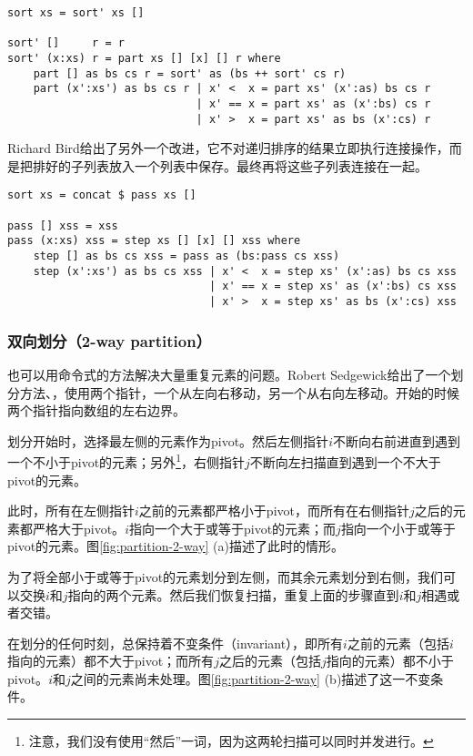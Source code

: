 \documentclass[UTF8]{article}
\begin{document}
\lstset{language=Haskell}
\begin{lstlisting}
sort xs = sort' xs []

sort' []     r = r
sort' (x:xs) r = part xs [] [x] [] r where
    part [] as bs cs r = sort' as (bs ++ sort' cs r)
    part (x':xs') as bs cs r | x' <  x = part xs' (x':as) bs cs r
                             | x' == x = part xs' as (x':bs) cs r
                             | x' >  x = part xs' as bs (x':cs) r
\end{lstlisting}

Richard Bird给出了另外一个改进\cite{fp-pearls}，它不对递归排序的结果立即执行连接操作，而是把排好的子列表放入一个列表中保存。最终再将这些子列表连接在一起。

\lstset{language=Haskell}
\begin{lstlisting}
sort xs = concat $ pass xs []

pass [] xss = xss
pass (x:xs) xss = step xs [] [x] [] xss where
    step [] as bs cs xss = pass as (bs:pass cs xss)
    step (x':xs') as bs cs xss | x' <  x = step xs' (x':as) bs cs xss
                               | x' == x = step xs' as (x':bs) cs xss
                               | x' >  x = step xs' as bs (x':cs) xss
\end{lstlisting} %

\subsubsection{双向划分（2-way partition）}

也可以用命令式的方法解决大量重复元素的问题。Robert Sedgewick给出了一个划分方法\cite{qsort-impl}、\cite{pearls}，使用两个指针，一个从左向右移动，另一个从右向左移动。开始的时候两个指针指向数组的左右边界。

划分开始时，选择最左侧的元素作为pivot。然后左侧指针$i$不断向右前进直到遇到一个不小于pivot的元素；另外\footnote{注意，我们没有使用“然后”一词，因为这两轮扫描可以同时并发进行。}，右侧指针$j$不断向左扫描直到遇到一个不大于pivot的元素。

此时，所有在左侧指针$i$之前的元素都严格小于pivot，而所有在右侧指针$j$之后的元素都严格大于pivot。$i$指向一个大于或等于pivot的元素；而$j$指向一个小于或等于pivot的元素。图\ref{fig:partition-2-way} (a)描述了此时的情形。

为了将全部小于或等于pivot的元素划分到左侧，而其余元素划分到右侧，我们可以交换$i$和$j$指向的两个元素。然后我们恢复扫描，重复上面的步骤直到$i$和$j$相遇或者交错。

在划分的任何时刻，总保持着不变条件（invariant），即所有$i$之前的元素（包括$i$指向的元素）都不大于pivot；而所有$j$之后的元素（包括$j$指向的元素）都不小于pivot。$i$和$j$之间的元素尚未处理。图\ref{fig:partition-2-way} (b)描述了这一不变条件。
\end{document}
